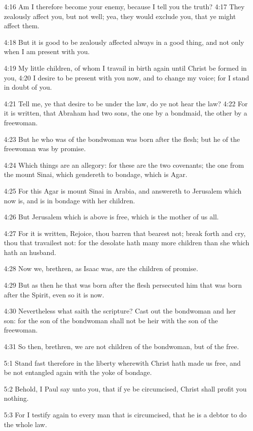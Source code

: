 4:16 Am I therefore become your enemy, because I tell you the truth?  4:17 They zealously affect you, but not well; yea, they would exclude you, that ye might affect them.

4:18 But it is good to be zealously affected always in a good thing, and not only when I am present with you.

4:19 My little children, of whom I travail in birth again until Christ be formed in you, 4:20 I desire to be present with you now, and to change my voice; for I stand in doubt of you.

4:21 Tell me, ye that desire to be under the law, do ye not hear the law?  4:22 For it is written, that Abraham had two sons, the one by a bondmaid, the other by a freewoman.

4:23 But he who was of the bondwoman was born after the flesh; but he of the freewoman was by promise.

4:24 Which things are an allegory: for these are the two covenants; the one from the mount Sinai, which gendereth to bondage, which is Agar.

4:25 For this Agar is mount Sinai in Arabia, and answereth to Jerusalem which now is, and is in bondage with her children.

4:26 But Jerusalem which is above is free, which is the mother of us all.

4:27 For it is written, Rejoice, thou barren that bearest not; break forth and cry, thou that travailest not: for the desolate hath many more children than she which hath an husband.

4:28 Now we, brethren, as Isaac was, are the children of promise.

4:29 But as then he that was born after the flesh persecuted him that was born after the Spirit, even so it is now.

4:30 Nevertheless what saith the scripture? Cast out the bondwoman and her son: for the son of the bondwoman shall not be heir with the son of the freewoman.

4:31 So then, brethren, we are not children of the bondwoman, but of the free.

5:1 Stand fast therefore in the liberty wherewith Christ hath made us free, and be not entangled again with the yoke of bondage.

5:2 Behold, I Paul say unto you, that if ye be circumcised, Christ shall profit you nothing.

5:3 For I testify again to every man that is circumcised, that he is a debtor to do the whole law.

